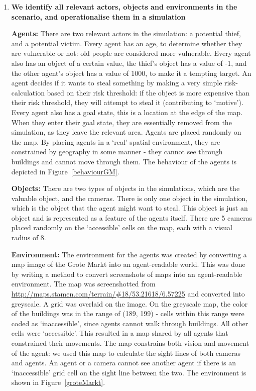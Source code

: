 \documentclass[11pt]{article}
\begin{document}
\begin{enumerate}
\item \textbf{We identify all relevant actors, objects and environments in the scenario, and operationalise them in a simulation}

\textbf{Agents:} There are two relevant actors in the simulation: a potential thief, and a potential victim. Every agent has an age, to determine whether they are vulnerable or not: old people are considered more vulnerable. Every agent also has an object of a certain value, the thief's object has a value of -1, and the other agent's object has a value of 1000, to make it a tempting target. An agent decides if it wants to steal something by making a very simple risk-calculation based on their risk threshold: if the object is more expensive than their risk threshold, they will attempt to steal it (contributing to `motive'). Every agent also has a goal state, this is a location at the edge of the map. When they enter their goal state, they are essentially removed from the simulation, as they leave the relevant area. Agents are placed randomly on the map.  By placing agents in a `real' spatial environment, they are constrained by geography in some manner - they cannot see through buildings and cannot move through them. The behaviour of the agents is depicted in Figure~\ref{behaviourGM}.


\textbf{Objects:} There are two types of objects in the simulations, which are the valuable object, and the cameras. 
There is only one object in the simulation, which is the object that the agent might want to steal. This object is just an object and is represented as a feature of the agents itself.
There are 5 cameras placed randomly on the `accessible' cells on the map, each with a visual radius of 8. 

\textbf{Environment:} The environment for the agents was created by converting a map image of the Grote Markt into an agent-readable world. This was done by writing a method to convert screenshots of maps into an agent-readable environment. The map was screenshotted from \url{http://maps.stamen.com/terrain/#18/53.21618/6.57225} and converted into greyscale. A grid was overlaid on the image. On the greyscale map, the color of the buildings was in the range of (189, 199) - cells within this range were coded as `inaccessible', since agents cannot walk through buildings. All other cells were `accessible'. This resulted in a map shared by all agents that constrained their movements. The map constrains both vision and movement of the agent: we used this map to calculate the sight lines of both cameras and agents. An agent or a camera cannot see another agent if there is an `inaccessible' grid cell on the sight line between the two. The environment is shown in Figure~\ref{groteMarkt}.



\end{enumerate}
\end{document}
